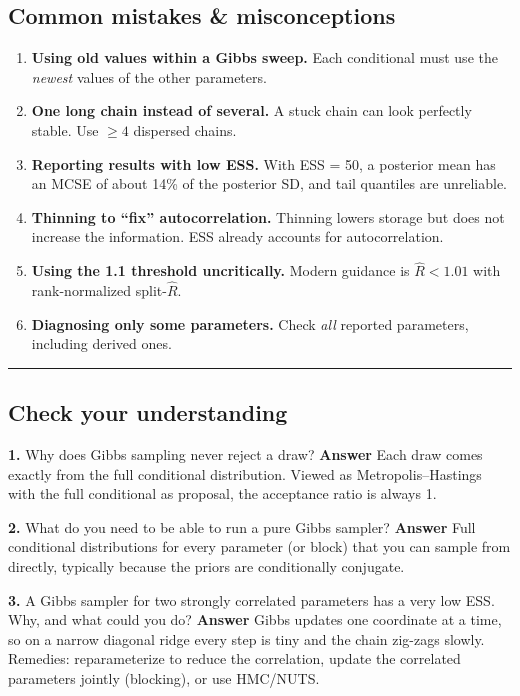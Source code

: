 \subsection{Common mistakes \& misconceptions}

\begin{enumerate}
\def\labelenumi{\arabic{enumi}.}
\tightlist
\item
  \textbf{Using old values within a Gibbs sweep.} Each conditional must
  use the \emph{newest} values of the other parameters.
\item
  \textbf{One long chain instead of several.} A stuck chain can look
  perfectly stable. Use \(\ge 4\) dispersed chains.
\item
  \textbf{Reporting results with low ESS.} With ESS = 50, a posterior
  mean has an MCSE of about 14\% of the posterior SD, and tail quantiles
  are unreliable.
\item
  \textbf{Thinning to ``fix'' autocorrelation.} Thinning lowers storage
  but does not increase the information. ESS already accounts for
  autocorrelation.
\item
  \textbf{Using the 1.1 threshold uncritically.} Modern guidance is
  \(\hat R < 1.01\) with rank-normalized split-\(\hat R\).
\item
  \textbf{Diagnosing only some parameters.} Check \emph{all} reported
  parameters, including derived ones.
\end{enumerate}

\begin{center}\rule{0.5\linewidth}{0.5pt}\end{center}

\subsection{Check your understanding}

\textbf{1.} Why does Gibbs sampling never reject a draw? \textbf{Answer}
Each draw comes exactly from the full conditional distribution. Viewed
as Metropolis--Hastings with the full conditional as proposal, the
acceptance ratio is always 1.

\textbf{2.} What do you need to be able to run a pure Gibbs sampler?
\textbf{Answer} Full conditional distributions for every parameter (or
block) that you can sample from directly, typically because the priors
are conditionally conjugate.

\textbf{3.} A Gibbs sampler for two strongly correlated parameters has a
very low ESS. Why, and what could you do? \textbf{Answer} Gibbs updates
one coordinate at a time, so on a narrow diagonal ridge every step is
tiny and the chain zig-zags slowly. Remedies: reparameterize to reduce
the correlation, update the correlated parameters jointly (blocking), or
use HMC/NUTS.

